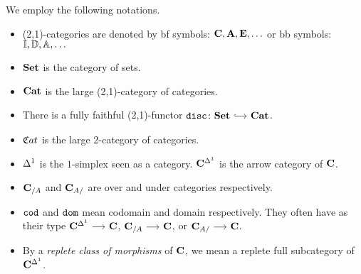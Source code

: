 \documentclass[a4paper,dvipsnames, 11pt]{amsart}
\begin{document}
\maketitle
\begin{notation}
	We employ the following notations.
	\begin{itemize}
		\item %
			(2,1)-categories are denoted by bf symbols:
			$\mathbf{C},\mathbf{A},\mathbf{E},\ldots$
			or bb symbols:
			$\mathbb{I},\mathbb{D},\mathbb{A},\ldots$
		\item %
			$\mathbf{Set}$ is the category of sets.
		\item %
			${\mathbf{Cat}}$ is the large (2,1)-category of categories.
		\item %
			There is a fully faithful (2,1)-functor $\disc\colon\Set\arr[hook]\Cat$.
		\item %
			${{\mathfrak{C}}{at}}$ is the large 2-category of categories.
		\item %
			${\Delta^1}$ is the $1$-simplex seen as a category.
			$\mathbf{C}^{\Delta^1}$ is the arrow category of $\mathbf{C}$.
		\item %
			$\mathbf{C}_{/A}$ and $\mathbf{C}_{A/}$ are over and under categories respectively.
		\item %
			$\mathtt{cod}$ and $\mathtt{dom}$ mean codomain and domain respectively. They often have as their type
			$\C^\ra\arr\C$, $\C_{/A}\arr\C$,
			or $\C_{A/}\arr\C$.
		\item %
			By a \emph{replete class of morphisms} of $\mathbf{C}$, we mean a replete full subcategory of $\mathbf{C}^{\Delta^1}$.
		\qedhere %
	\end{itemize}
\end{notation}
\end{document}
